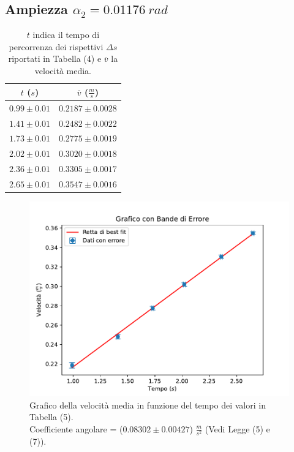 \documentclass[11pt]{article}
\begin{document}
\subsection{Ampiezza $\alpha_2=0.01176\ rad$}
\begin{table}[H]
\centering
\begin{tabular}{|c|c|}
\hline
\textbf{$t$ ($s$)} & \textbf{$\overline{v}$ ($\frac{m}{s}$)} \\
\hline
$0.99\pm 0.01$ & $0.2187\pm 0.0028$ \\
$1.41\pm 0.01$ & $0.2482\pm 0.0022$ \\
$1.73\pm 0.01$ & $0.2775\pm 0.0019$ \\
$2.02\pm 0.01$ & $0.3020\pm 0.0018$ \\
$2.36\pm 0.01$ & $0.3305\pm 0.0017$ \\
$2.65\pm 0.01$ & $0.3547\pm 0.0016$ \\
\hline
\end{tabular}
\caption{$t$ indica il tempo di percorrenza dei rispettivi $\Delta s$ riportati in Tabella (4) e $\overline{v}$ la velocità media.}
\label{tab:}
\end{table}
\begin{figure}[H]
  \centering
  \includegraphics[width=1\textwidth]{grafico2p1.pdf}
  \caption{Grafico della velocità media in funzione del tempo dei valori in Tabella (5). \\
    Coefficiente angolare = ($0.08302\pm 0.00427$) $\frac{m}{s^2}$ (Vedi Legge (5) e (7)).}
\end{figure}
\end{document}
